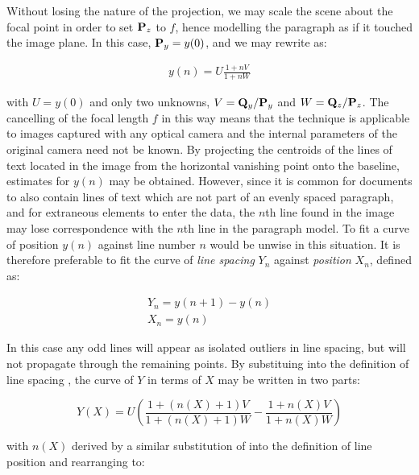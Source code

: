 {\parindent 0mm
Without losing the nature of the projection, we may scale the scene about the focal point in order to set ${ \bf P }_z$ to $f$, hence modelling the paragraph as if it touched the image plane.  In this case, ${ \bf P }_y=y(0)$,
and we may rewrite  as:
}

\begin{eqnarray}
y(n) = U \frac{ 1 + nV }{ 1 + nW } \label{spacingsvweqn}
\end{eqnarray}

{ \parindent 0mm
with $U=y(0)$ and only two unknowns,
$V = {{ \bf Q }_y}/{{ \bf P }_y}$ and $W = {{ \bf Q }_z}/{{ \bf P }_z}$.
The cancelling of the focal length $f$ in this way means that the technique is
applicable to images captured with any optical camera and the internal
parameters of the original camera need not be known.
By projecting the centroids of the lines of text located in the image from the horizontal vanishing point onto the baseline, estimates for $y(n)$ may be obtained.
However, since it is common for documents to also contain lines of text which are not part of an evenly spaced paragraph, and for extraneous elements to enter the data, the $n$th line found in the image may lose correspondence with the $n$th line in the paragraph model.
To fit a curve of position $y(n)$ against line number $n$ would be unwise in this situation.
It is therefore preferable to fit the curve of {\em line spacing} $Y_n$
against {\em position} $X_n$, defined as:

\begin{eqnarray}
Y_n=y(n+1)-y(n) \label{linespacingsdefneqn} \\
X_n=y(n) \label{linepositiondefneqn}
\end{eqnarray}

In this case any odd lines will appear as isolated outliers in line spacing, but will not propagate through the remaining points.
By substituing  into the definition of line spacing , the curve of $Y$ in terms of $X$ may be written in two parts:
}

\begin{equation}
Y(X) = U ( \frac{1+(n(X)+1)V}{1+(n(X)+1)W} - \frac{1+n(X)V}{1+n(X)W} )
\label{fittingeqn}
\end{equation}

{\parindent 0mm
with $n(X)$ derived by a similar substitution of  into the definition of line position  and rearranging to:
}


